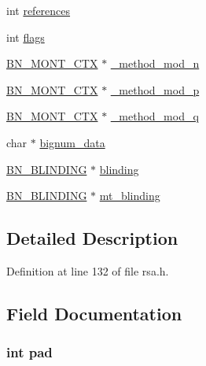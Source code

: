 \begin{DoxyCompactItemize}
\item 
int \hyperlink{structrsa__st_a146fdb34d9a909e530adf8b189481195}{references}
\item 
int \hyperlink{structrsa__st_ac8bf36fe0577cba66bccda3a6f7e80a4}{flags}
\item 
\hyperlink{crypto_2ossl__typ_8h_aec902d353e00ced6d3fee6cd033a8bd0}{B\+N\+\_\+\+M\+O\+N\+T\+\_\+\+C\+TX} $\ast$ \hyperlink{structrsa__st_a32bde9c7596928c8a8dcab6a8cb669f9}{\+\_\+method\+\_\+mod\+\_\+n}
\item 
\hyperlink{crypto_2ossl__typ_8h_aec902d353e00ced6d3fee6cd033a8bd0}{B\+N\+\_\+\+M\+O\+N\+T\+\_\+\+C\+TX} $\ast$ \hyperlink{structrsa__st_a753b5727e91877a46b638808aed70e3c}{\+\_\+method\+\_\+mod\+\_\+p}
\item 
\hyperlink{crypto_2ossl__typ_8h_aec902d353e00ced6d3fee6cd033a8bd0}{B\+N\+\_\+\+M\+O\+N\+T\+\_\+\+C\+TX} $\ast$ \hyperlink{structrsa__st_ad0769a8a75972cb2fbf89d11a4392235}{\+\_\+method\+\_\+mod\+\_\+q}
\item 
char $\ast$ \hyperlink{structrsa__st_a011a2c596f08669113df7125718cbb5e}{bignum\+\_\+data}
\item 
\hyperlink{crypto_2ossl__typ_8h_a38325fe1e4071c8c097396804df843bb}{B\+N\+\_\+\+B\+L\+I\+N\+D\+I\+NG} $\ast$ \hyperlink{structrsa__st_acefa66837a7d5554aa3c473b994a9c33}{blinding}
\item 
\hyperlink{crypto_2ossl__typ_8h_a38325fe1e4071c8c097396804df843bb}{B\+N\+\_\+\+B\+L\+I\+N\+D\+I\+NG} $\ast$ \hyperlink{structrsa__st_a6fcbfb2cf4903d40d8c510eb05088f2c}{mt\+\_\+blinding}
\end{DoxyCompactItemize}


\subsection{Detailed Description}


Definition at line 132 of file rsa.\+h.



\subsection{Field Documentation}
\subsubsection[{\texorpdfstring{pad}{pad}}]{\setlength{\rightskip}{0pt plus 5cm}int pad}\hypertarget{structrsa__st_af1d40a330bc745f51d8b079c9dc473ff}{}\label{structrsa__st_af1d40a330bc745f51d8b079c9dc473ff}


